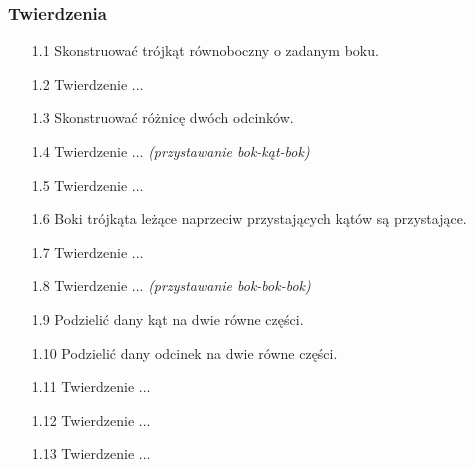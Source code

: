 \subsubsection{Twierdzenia}	
\begin{enumerate}	
    \item [1.1] Skonstruować trójkąt równoboczny o zadanym boku.
    \item [1.2] Twierdzenie ... %
    \item [1.3] Skonstruować różnicę dwóch odcinków.
    \item [1.4] Twierdzenie ... \hfill \emph{(przystawanie bok-kąt-bok)} %
    \item [1.5] Twierdzenie ... %
    \item [1.6] Boki trójkąta leżące naprzeciw przystających kątów są przystające.
    \item [1.7] Twierdzenie ... %
    \item [1.8] Twierdzenie ... \hfill \emph{(przystawanie bok-bok-bok)} %
    \item [1.9] Podzielić dany kąt na dwie równe części.
    \item [1.10] Podzielić dany odcinek na dwie równe części.
    \item [1.11] Twierdzenie ... %
    \item [1.12] Twierdzenie ... %
    \item [1.13] Twierdzenie ... %

\end{enumerate}
